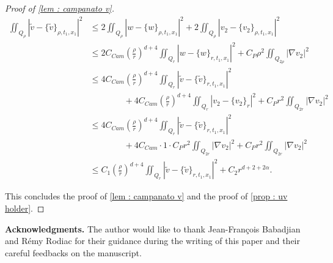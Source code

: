 \documentclass[reqno,12pt,twoside]{amsart}
\numberwithin{equation}{section} \numberwithin{theorem}{section}
\numberwithin{proposition}{section} \numberwithin{lemma}{section}
\numberwithin{corollary}{section}
\numberwithin{definition}{section} \numberwithin{remark}{section}
\begin{document}
\begin{proof}[Proof of \autoref{lem : campanato v}]
\begin{align*}
\iint_{Q_\rho} |\widetilde{v}- \{\widetilde{v}\}_{\rho,t_1,x_1}|^2&\leqslant 2 \iint_{Q_\rho} |w- \{w\}_{\rho,t_1,x_1}|^2 + 2\iint_{Q_\rho} |v_2- \{v_2\}_{\rho,t_1,x_1}|^2\\
&\leqslant 2 C_{Cam}\left(\frac{\rho}{r}\right)^{d+4}\iint_{Q_{r}} |w -\{w\}_{r,t_1,x_1}|^2 + C_P \rho^2 \iint_{Q_{2\rho}} |\nabla v_2|^2\\
&\leqslant 4C_{Cam}\left(\frac{\rho}{r}\right)^{d+4}\iint_{Q_{r}} |\widetilde{v} -\{\widetilde{v}\}_{r,t_1,x_1}|^2\\
&\quad\quad\quad \quad + 4C_{Cam}\left(\frac{\rho}{r}\right)^{d+4}\iint_{Q_{r}} |v_2 -\{v_2\}_{r}|^2 + C_P r^2 \iint_{Q_{2r}} |\nabla v_2|^2 \\
&\leqslant 4C_{Cam}\left(\frac{\rho}{r}\right)^{d+4}\iint_{Q_{r}} |\widetilde{v} -\{\widetilde{v}\}_{r,t_1,x_1}|^2\\
&\quad \quad \quad \quad  + 4C_{Cam}\cdot 1 \cdot C_P r^2 \iint_{Q_{2r}} |\nabla v_2|^2 +  C_P r^2 \iint_{Q_{2r}} |\nabla v_2|^2\\
&\leqslant C_1 \left(\frac{\rho}{r}\right)^{d+4}\iint_{Q_r} |\widetilde{v} -\{\widetilde{v}\}_{r,t_1,x_1}|^2  + C_2 r^{d+2+2\alpha}. 
\end{align*} 

This concludes the proof of \autoref{lem : campanato v} and the proof of \autoref{prop : uv holder}.
\end{proof}

\textbf{Acknowledgments.} The author would like to thank Jean-François Babadjian and Rémy Rodiac for their guidance during the writing of this paper and their careful feedbacks on the manuscript. 




\end{document}
